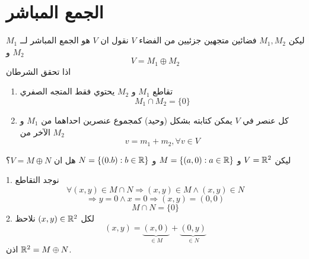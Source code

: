 \section[الجمع المباشر]{الجمع المباشر \cite{key1}}
ليكن $M_1, M_2$ فضائين متجهين جزئيين من الفضاء $V$ نقول ان $V$ هو الجمع المباشر لــ $M_1$ و $M_2$ 
\[
V  = M_1 \oplus M_2
\]
اذا تحقق الشرطان
\begin{enumerate}
	\item تقاطع $M_1$ و $M_2$ يحتوي فقط المتجه الصفري
	\[
	M_1 \cap M_2 = \{0\}
	\]
	\item كل عنصر في $V$ يمكن كتابته بشكل (وحيد) كمجموع عنصرين احداهما من $M_1$ و الآخر من $M_2$
	\[
	v = m_1 + m_2, \forall v\in V
	\]
\end{enumerate}

\begin{example}
	ليكن $V = \mathbb{R}^2$ و $M = \{(a, 0) : a\in \mathbb{R}\}$ و $N = \{(0.b) : b\in \mathbb{R}\}$ هل ان $V = M \oplus N$؟
\end{example}
\begin{solution}
	1. نوجد التقاطع
	\[
	\forall (x, y) \in M \cap N \Rightarrow (x, y) \in M \wedge (x, y)\in N
	\]
	\[
	\Rightarrow y=0 \wedge x=0 \Rightarrow (x, y)=(0,0)
	\]
	\[
	M \cap N = \{0\}
	\]
	2. لكل $(x, y) \in \mathbb{R}^2$ نلاحظ
	\[
	(x, y) = \underbrace{(x, 0)}_{\in M} + \underbrace{(0, y)}_{\in N}
	\]
	اذن $\mathbb{R}^2 = M\oplus N$.
\end{solution}
	
